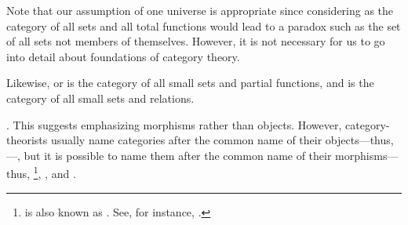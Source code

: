 \begin{remark}


  Note that our assumption of one universe is appropriate since
  considering \set as the category of all sets and all total functions
  would lead to a paradox such as the set of all sets not members of
  themselves. However, it is not necessary for us to go into detail
  about foundations of category theory.

\end{remark}

\begin{example}


  \label{ex:par-rel}




  Likewise,  or  is the category of all small
  sets and partial functions, and  is the category of all
  small sets and relations.

\end{example}

\begin{remark}

  . This
  suggests emphasizing morphisms rather than objects. However,
  category-theorists usually name categories after the common name of
  their objects---thus, \set---, but it is possible to name them after
  the common name of their morphisms---thus, \footnote{\set
    is also known as . See, for instance,
    \parencite{bird-demoor-1997}.}, , and .



\end{remark}

